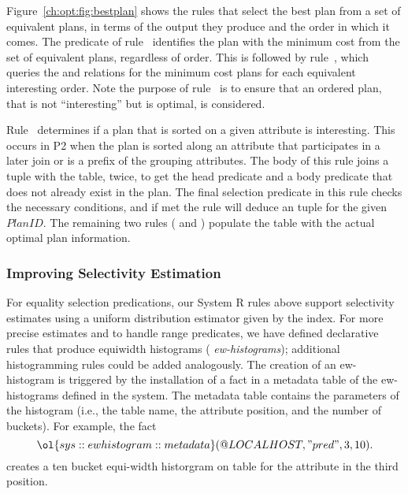 Figure~\ref{ch:opt:fig:bestplan} shows the rules that select the best plan from
a set of equivalent plans, in terms of the output they produce and the order in
which it comes.  The  predicate of rule~ identifies
the plan with the minimum cost from the set of equivalent plans, regardless of
order.  This is followed by rule~, which queries the  and
 relations for the minimum cost plans for each equivalent
interesting order.  Note the purpose of rule~ is to ensure that an
ordered plan, that is not ``interesting'' but is optimal, is considered.

Rule~ determines if a plan that is sorted on a given attribute is
interesting.  This occurs in P2 when the plan is sorted along an attribute that
participates in a later join or is a prefix of the grouping attributes.  The
body of this rule joins a  tuple with the  table, twice,
to get the head predicate and a body predicate that does not already exist in
the plan.  The final selection predicate in this rule checks the necessary
conditions, and if met the rule will deduce an  tuple for
the given $PlanID$.  The remaining two rules ( and ) populate
the  table with the actual optimal plan information.

\subsubsection{Improving Selectivity Estimation}

For equality selection predications, our System R rules above support
selectivity estimates using a uniform distribution estimator given by the
index.  For more precise estimates and to handle range predicates, we have
defined declarative rules that produce equiwidth histograms ({\em
ew-histograms}); additional histogramming rules could be added analogously.
The creation of an ew-histogram is triggered by the installation of a fact in a
metadata table of the ew-histograms defined in the system.  The metadata table
contains the parameters of the histogram (i.e., the table name, the attribute
position, and the number of buckets).  For example, the fact \[
\ol{sys::ewhistogram::metadata}(@LOCALHOST, "pred", 3, 10).  \] creates a ten
bucket equi-width historgram on table  for the attribute in the third
position.

